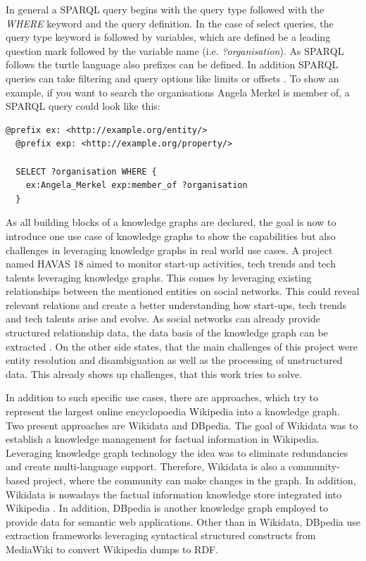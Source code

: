 \documentclass[a4paper,oneside,bibliography=totoc]{scrbook}
\begin{document}
In general a \ac{SPARQL} query begins with the query type followed with the \textit{WHERE} keyword and the query definition. In the case of select queries, the query type keyword is followed by variables, which are defined be a leading question mark followed by the variable name (i.e. \textit{?organisation}). As \ac{SPARQL} follows the turtle language also prefixes can be defined. In addition \ac{SPARQL} queries can take filtering and query options like limits or offsets \cite{VillazonTerrazas2017}. To show an example, if you want to search the organisations Angela Merkel is member of, a \ac{SPARQL} query could look like this:

\begin{lstlisting}[language=SPARQL, caption=Example of a SPARQL Query, label=lst:turtle_example]
  @prefix ex: <http://example.org/entity/>
  @prefix exp: <http://example.org/property/>
  
  SELECT ?organisation WHERE {
    ex:Angela_Merkel exp:member_of ?organisation
  }
  \end{lstlisting}

As all building blocks of a knowledge graphs are declared, the goal is now to introduce one use case of knowledge graphs to show the capabilities but also challenges in leveraging knowledge graphs in real world use cases. A project named HAVAS 18 aimed to monitor start-up activities, tech trends and tech talents leveraging knowledge graphs. This comes by leveraging existing relationships between the mentioned entities on social networks. This could reveal relevant relations and create a better understanding how start-ups, tech trends and tech talents arise and evolve. As social networks can already provide structured relationship data, the data basis of the knowledge graph can be extracted \cite{Monti2017}. On the other side \citet{Monti2017} states, that the main challenges of this project were entity resolution and disambiguation as well as the processing of unstructured data. This already shows up challenges, that this work tries to solve.

In addition to such specific use cases, there are approaches, which try to represent the largest online encyclopoedia Wikipedia into a knowledge graph. Two present approaches are Wikidata and DBpedia. The goal of Wikidata was to establish a knowledge management for factual information in Wikipedia. Leveraging knowledge graph technology the idea was to eliminate redundancies and create multi-language support. Therefore, Wikidata is also a community-based project, where the community can make changes in the graph. In addition, Wikidata is nowadays the factual information knowledge store integrated into Wikipedia \cite{Vrandecic2014}. In addition, DBpedia is another knowledge graph employed to provide data for semantic web applications. Other than in Wikidata, DBpedia use extraction frameworks leveraging syntactical structured constructs from MediaWiki to convert Wikipedia dumps to \ac{RDF}.
\end{document}
